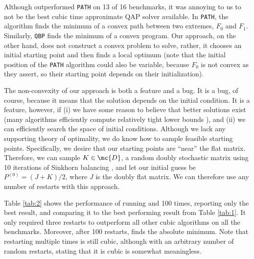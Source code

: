 \documentclass[10pt,journal,cspaper,compsoc]{IEEEtran}
\begin{document}
Although \faqap outperformed \texttt{PATH} on 13 of 16 benchmarks, it was annoying to us to not be the best cubic time approximate QAP solver available.  
In \texttt{PATH}, the algorithm finds the minimum of a convex path between two extremes, $F_0$ and $F_1$.  Similarly, \texttt{QBP} finds the minimum of a convex program.  Our approach, on the other hand, does not construct a convex problem to solve, rather, it chooses an initial starting point and then finds a local optimum (note that the initial position of the \texttt{PATH} algorithm could also be variable, because $F_0$ is not convex as they assert, so their starting point depends on their initialization). 

 The non-convexity of our approach is both a feature and a bug.  It is a bug, of course, because it means that the solution depends on the initial condition.  It is a feature, however, if (i) we have some reason to believe that better solutions exist (many algorithms efficiently compute relatively tight lower bounds \cite{Anstreicher2009}), and (ii) we can efficiently search the space of initial conditions.  Although we  lack any supporting theory of optimality, we do know how to sample feasible starting points.  Specifically, we desire that our starting points are ``near'' the flat matrix.  Therefore, we can sample $K \in \mc{D}$, a random doubly stochastic matrix using 10 iterations of Sinkhorn balancing \cite{Sinkhorn1964}, and let our initial guess be $P^{(0)}=(J+K)/2$, where $J$ is the doubly flat matrix.  We can therefore use any number of restarts with this approach.  

Table \ref{tab:2} shows the performance of running  and 100 times, reporting only the best result, and comparing it to the best performing result from Table \ref{tab:1}.  It only required three restarts to outperform all other cubic algorithms on all the benchmarks.  Moreover, after 100 restarts, \faqap finds the absolute minimum.  Note that restarting \faqap multiple times is still cubic, although with an arbitrary number of random restarts, stating that it is cubic is somewhat meaningless.  




\end{document}
